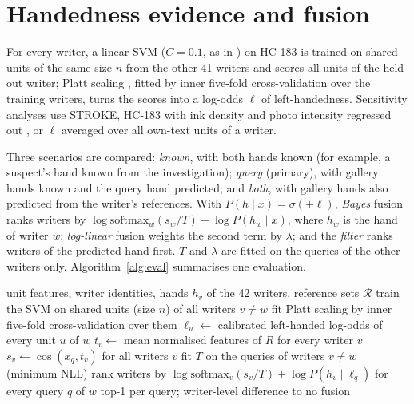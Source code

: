 \documentclass[conference]{IEEEtran}
\begin{document}
\section{Handedness evidence and fusion}
\label{sec:methods}
For every writer, a linear SVM ($C=0.1$, as in \cite{anon2026handedness}) on HC-183 is trained on shared units of the same size $n$ from the other 41 writers and scores all units of the held-out writer; Platt scaling \cite{platt1999probabilistic}, fitted by inner five-fold cross-validation over the training writers, turns the scores into a log-odds $\ell$ of left-handedness. Sensitivity analyses use STROKE, HC-183 with ink density and photo intensity regressed out \cite{anon2026handedness}, or $\ell$ averaged over all own-text units of a writer.

Three scenarios are compared: \emph{known}, with both hands known (for example, a suspect's hand known from the investigation); \emph{query} (primary), with gallery hands known and the query hand predicted; and \emph{both}, with gallery hands also predicted from the writer's references. With $P(h\mid x)=\sigma(\pm\ell)$, \emph{Bayes} fusion ranks writers by $\log\mathrm{softmax}_w(s_w/T)+\log P(h_w\mid x)$, where $h_w$ is the hand of writer $w$; \emph{log-linear} fusion weights the second term by $\lambda$; and the \emph{filter} ranks writers of the predicted hand first. $T$ and $\lambda$ are fitted on the queries of the other writers only. Algorithm~\ref{alg:eval} summarises one evaluation.
\begin{algorithm}[t]
\caption{Evaluation of one setting with predicted query handedness}
\label{alg:eval}
\footnotesize
\begin{algorithmic}[1]
\Require unit features, writer identities, hands $h_v$ of the 42 writers, reference sets $\mathcal{R}$
  \State train the SVM on shared units (size $n$) of all writers $v\neq w$
  \State fit Platt scaling by inner five-fold cross-validation over them
  \State $\ell_u\gets$ calibrated left-handed log-odds of every unit $u$ of $w$
\EndFor
{}
  \State $t_v\gets$ mean normalised features of $R$ for every writer $v$
  \State $s_v\gets\cos(x_q,t_v)$ for all writers $v$
\EndFor
{}
  \State fit $T$ on the queries of writers $v\neq w$ (minimum NLL)
  \State rank writers by $\log\mathrm{softmax}_v(s_v/T)+\log P(h_v\mid\ell_q)$ for every query $q$ of $w$
\EndFor
\State \Return top-1 per query; writer-level difference to no fusion
\end{algorithmic}
\end{algorithm}
\end{document}
